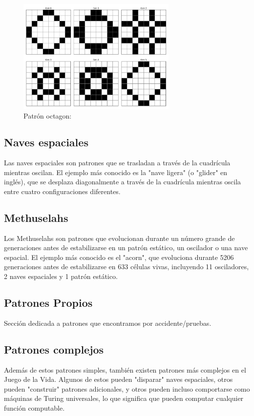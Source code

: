 \documentclass[]{article}
\begin{document}
    \begin{figure}[H]
      \centering
      \includegraphics[width=0.7\textwidth]{../assets/oscillator/octagon_2/octagon_2.png}
      \caption{Patrón octagon: }
      \label{fig:octagon}
      \end{figure}

\subsection{Naves espaciales}
Las naves espaciales son patrones que se trasladan a través de la cuadrícula mientras oscilan. El ejemplo más conocido es la "nave ligera" (o "glider" en inglés), que se desplaza diagonalmente a través de la cuadrícula mientras oscila entre cuatro configuraciones diferentes.

\subsection{Methuselahs}
Los Methuselahs son patrones que evolucionan durante un número grande de generaciones antes de estabilizarse en un patrón estático, un oscilador o una nave espacial. El ejemplo más conocido es el "acorn", que evoluciona durante 5206 generaciones antes de estabilizarse en 633 células vivas, incluyendo 11 osciladores, 2 naves espaciales y 1 patrón estático.


\subsection{Patrones Propios}
Sección dedicada a patrones que encontramos por accidente/pruebas.

\subsection{Patrones complejos}
Además de estos patrones simples, también existen patrones más complejos en el Juego de la Vida. Algunos de estos pueden "disparar" naves espaciales, otros pueden "construir" patrones adicionales, y otros pueden incluso comportarse como máquinas de Turing universales, lo que significa que pueden computar cualquier función computable.
\end{document}
